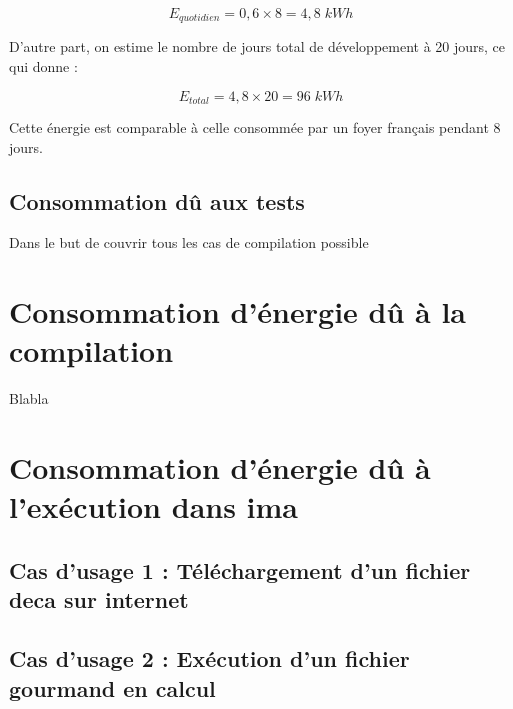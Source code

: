 \documentclass[12pt, a4paper, one side]{article}
\begin{document}
\begin{equation}
E_{quotidien}=0,6\times 8 = 4,8\; kWh
\end{equation}

D'autre part, on estime le nombre de jours total de développement à 20 jours, ce qui donne :

\begin{equation}
E_{total}=4,8\times 20 = 96\; kWh
\end{equation}


Cette énergie est comparable à celle consommée par un foyer français pendant 8 jours.

\subsection{Consommation dû aux tests}

Dans le but de couvrir tous les cas de compilation possible

\section{Consommation d'énergie dû à la compilation}

Blabla

\section{Consommation d'énergie dû à l'exécution dans ima}

\subsection{Cas d'usage 1 : Téléchargement d'un fichier deca sur internet}

\subsection{Cas d'usage 2 : Exécution d'un fichier gourmand en calcul}
\end{document}
